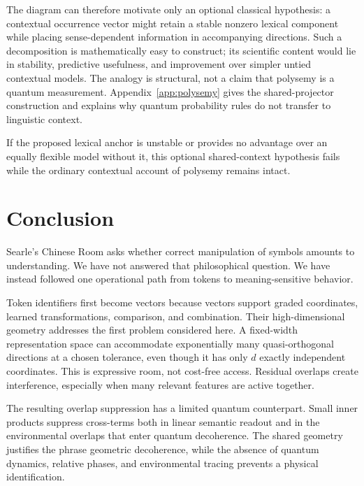 \documentclass[
  aps,
  reprint,
  superscriptaddress,
  floatfix,
  nofootinbib,
  longbibliography
]{revtex4-2}
\begin{document}
The diagram can therefore motivate only an optional classical hypothesis: a
contextual occurrence vector might retain a stable nonzero lexical component
while placing sense-dependent information in accompanying directions.  Such a
decomposition is mathematically easy to construct; its scientific content
would lie in stability, predictive usefulness, and improvement over simpler
untied contextual models.  The analogy is structural, not a claim that
polysemy is a quantum measurement.  Appendix~\ref{app:polysemy} gives the
shared-projector construction and explains why quantum probability rules do
not transfer to linguistic context.

If the proposed lexical anchor is unstable or provides no advantage over an
equally flexible model without it, this optional shared-context hypothesis
fails while the ordinary contextual account of polysemy remains intact.

\section{Conclusion}
\label{sec:conclusion}

Searle's Chinese Room asks whether correct manipulation of symbols amounts to
understanding.  We have not answered that philosophical question.  We have
instead followed one operational path from tokens to meaning-sensitive
behavior.

Token identifiers first become vectors because vectors support graded
coordinates, learned transformations, comparison, and combination.  Their
high-dimensional geometry addresses the first problem considered here.  A
fixed-width representation space can accommodate exponentially many
quasi-orthogonal
directions at a chosen tolerance, even though it has only $d$ exactly
independent coordinates.  This is expressive room, not cost-free access.
Residual overlaps create interference, especially when many relevant features
are active together.

The resulting overlap suppression has a limited quantum counterpart.  Small
inner products suppress cross-terms both in linear semantic readout and in
the environmental overlaps that enter quantum decoherence.  The shared
geometry justifies the phrase geometric decoherence, while the absence of
quantum dynamics, relative phases, and environmental tracing prevents a
physical identification.
\end{document}
